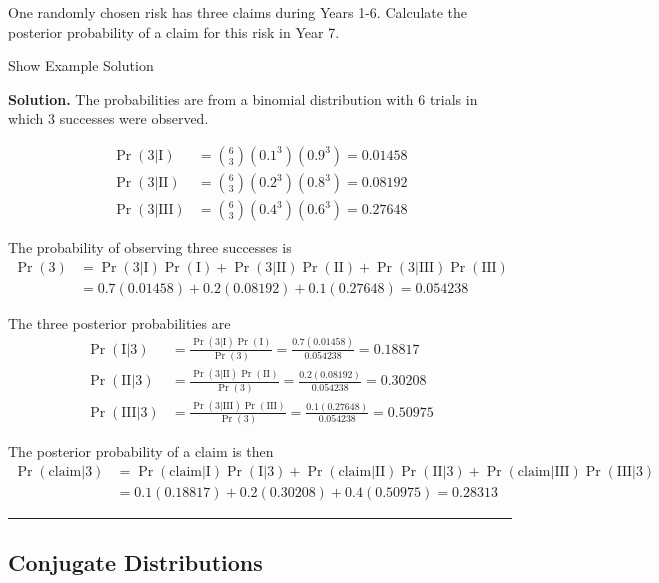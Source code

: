 \documentclass[]{book}
\theoremstyle{definition}
\theoremstyle{definition}
\theoremstyle{definition}
\theoremstyle{remark}
\begin{document}
One randomly chosen risk has three claims during Years 1-6. Calculate
the posterior probability of a claim for this risk in Year 7.

Show Example Solution

\hypertarget{toggleExampleSelect.4.6}{}
\textbf{Solution.} The probabilities are from a binomial distribution
with 6 trials in which 3 successes were observed.

\[\begin{aligned} 
\Pr(3|\text{I}) &= {6 \choose 3} (0.1^3)(0.9^3) = 0.01458 \\
\Pr(3|\text{II}) &= {6 \choose 3} (0.2^3)(0.8^3) = 0.08192 \\
\Pr(3|\text{III}) &= {6 \choose 3} (0.4^3)(0.6^3) = 0.27648
\end{aligned}\]

The probability of observing three successes is
\[\begin{aligned} \Pr(3) &= \Pr(3|\text{I})\Pr(\text{I}) + \Pr(3|\text{II})\Pr(\text{II}) + \Pr(3|\text{III})\Pr(\text{III}) \\
&=  0.7(0.01458) + 0.2(0.08192) + 0.1(0.27648) = 0.054238
\end{aligned}\]

The three posterior probabilities are \[\begin{aligned}
\Pr(\text{I}|3) &= \frac{\Pr(3|\text{I})\Pr(\text{I})}{\Pr(3)} = \frac{0.7(0.01458)}{0.054238} = 0.18817 \\
\Pr(\text{II}|3) &= \frac{\Pr(3|\text{II})\Pr(\text{II})}{\Pr(3)} = \frac{0.2(0.08192)}{0.054238} = 0.30208 \\
\Pr(\text{III}|3) &= \frac{\Pr(3|\text{III})\Pr(\text{III})}{\Pr(3)} = \frac{0.1(0.27648)}{0.054238} = 0.50975 
\end{aligned}\]

The posterior probability of a claim is then \[\begin{aligned} 
\Pr(\text{claim} | 3) &= \Pr(\text{claim}|\text{I})\Pr(\text{I} | 3) + \Pr(\text{claim} | \text{II})\Pr(\text{II} | 3) + \Pr(\text{claim} | \text{III}) \Pr(\text{III} | 3) \\ 
&= 0.1(0.18817) + 0.2(0.30208) + 0.4(0.50975) = 0.28313
\end{aligned}\]

\begin{center}\rule{0.5\linewidth}{\linethickness}\end{center}

\subsection{Conjugate Distributions}\label{S:ConjugateDistributions}
\end{document}
